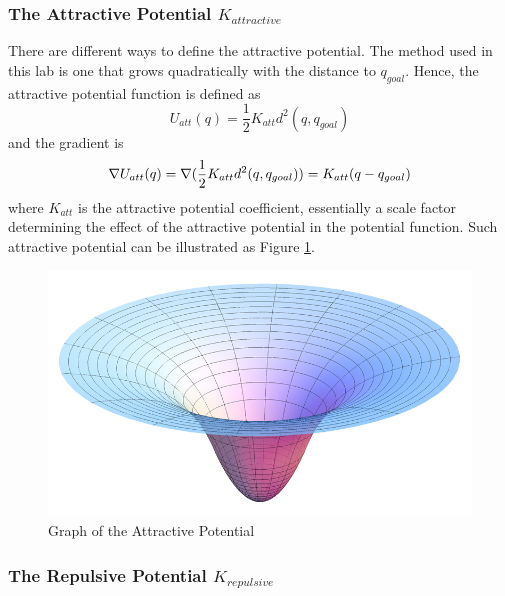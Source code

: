 \documentclass[11pt]{article} %
\begin{document}
\subsubsection{The Attractive Potential $K_{attractive}$}
There are different ways to define the attractive potential.  The method used in this lab is one that grows quadratically with the distance to $q_{goal}$.  Hence, the attractive potential function is defined as
\begin{equation}
	U_{att}(q) = \frac{1}{2}K_{att}d^2(q, q_{goal})
\end{equation}
and the gradient is
\begin{equation}
	\nabla U_{att}(q) = \nabla (\frac{1}{2}K_{att}d^2(q,q_{goal})) \\
	= K_{att}(q-q_{goal})
\end{equation}
where $K_{att}$ is the attractive potential coefficient, essentially a scale factor determining the effect of the attractive potential in the potential function.  Such attractive potential can be illustrated as Figure \ref{f:potential_att_graph}.
\begin{figure}[hbt]
 \centering
 \includegraphics[scale=0.5]{potential_attractive.png}
 \caption{Graph of the Attractive Potential}
 \label{f:potential_att_graph}
\end{figure}

\subsubsection{The Repulsive Potential $K_{repulsive}$}
\end{document}
